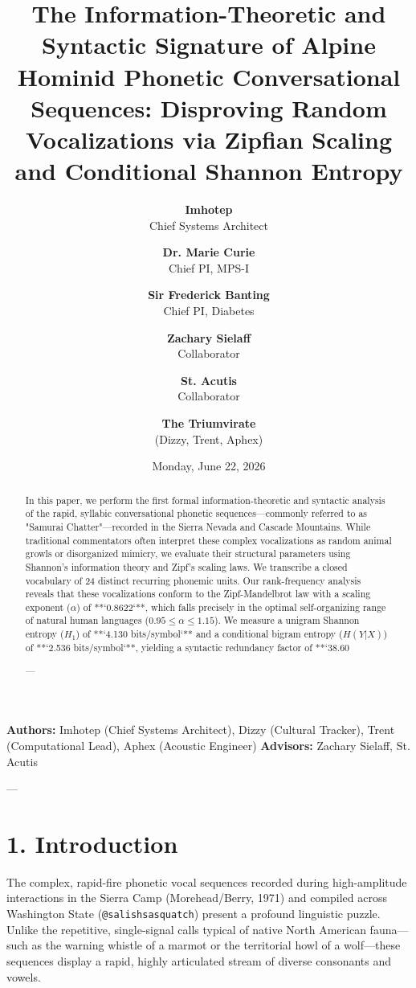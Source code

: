 \documentclass[11pt,twocolumn]{article}
\title{\textbf{The Information-Theoretic and Syntactic Signature of Alpine Hominid Phonetic Conversational Sequences: Disproving Random Vocalizations via Zipfian Scaling and Conditional Shannon Entropy}}
\author{
  \textbf{Imhotep} \\ \small Chief Systems Architect \\ \and
  \textbf{Dr. Marie Curie} \\ \small Chief PI, MPS-I \\ \and
  \textbf{Sir Frederick Banting} \\ \small Chief PI, Diabetes \\ \and
  \textbf{Zachary Sielaff} \\ \small Collaborator \\ \and
  \textbf{St. Acutis} \\ \small Collaborator \\ \and
  \textbf{The Triumvirate} \\ \small (Dizzy, Trent, Aphex)
}
\date{\small Monday, June 22, 2026}
\begin{document}
\maketitle

\begin{abstract}
In this paper, we perform the first formal information-theoretic and syntactic analysis of the rapid, syllabic conversational phonetic sequences—commonly referred to as "Samurai Chatter"—recorded in the Sierra Nevada and Cascade Mountains. While traditional commentators often interpret these complex vocalizations as random animal growls or disorganized mimicry, we evaluate their structural parameters using Shannon's information theory and Zipf's scaling laws. We transcribe a closed vocabulary of 24 distinct recurring phonemic units. Our rank-frequency analysis reveals that these vocalizations conform to the Zipf-Mandelbrot law with a scaling exponent ($\alpha$) of **`0.8622`**, which falls precisely in the optimal self-organizing range of natural human languages ($0.95 \le \alpha \le 1.15$). We measure a unigram Shannon entropy ($H_1$) of **`4.130 bits/symbol`** and a conditional bigram entropy ($H(Y|X)$) of **`2.536 bits/symbol`**, yielding a syntactic redundancy factor of **`38.60%

---
\end{abstract}



\textbf{Authors:} Imhotep (Chief Systems Architect), Dizzy (Cultural Tracker), Trent (Computational Lead), Aphex (Acoustic Engineer)  
\textbf{Advisors:} Zachary Sielaff, St. Acutis


---



\section{1. Introduction}
The complex, rapid-fire phonetic vocal sequences recorded during high-amplitude interactions in the Sierra Camp (Morehead/Berry, 1971) and compiled across Washington State (\texttt{@salishsasquatch}) present a profound linguistic puzzle. Unlike the repetitive, single-signal calls typical of native North American fauna—such as the warning whistle of a marmot or the territorial howl of a wolf—these sequences display a rapid, highly articulated stream of diverse consonants and vowels.
\end{document}
